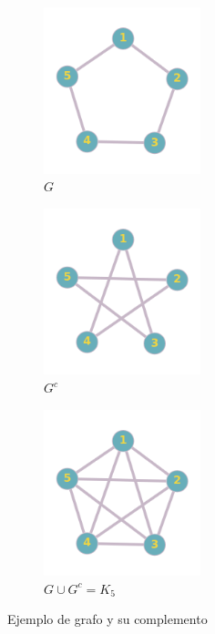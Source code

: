 \documentclass[a4paper,1pt]{report}
\begin{document}
\begin{figure}[H]
    \centering
    \begin{subfigure}[b]{0.30\textwidth}
    \centering
    \includegraphics[width=0.5\textwidth]{figures2/C5.png}
    \caption{$G$}
    \end{subfigure}
    \begin{subfigure}[b]{0.30\textwidth}
        \centering
    \includegraphics[width=0.5\textwidth]{figures2/C5comp.png}
    \caption{$G^c$}
    \end{subfigure}
    \begin{subfigure}[b]{0.30\textwidth}
        \centering
    \includegraphics[width=0.5\textwidth]{figures2/K5.png}
    \caption{$G \cup G^c = K_5$}
    \end{subfigure}
    \caption{Ejemplo de grafo y su complemento}
\end{figure} 
\end{document}
